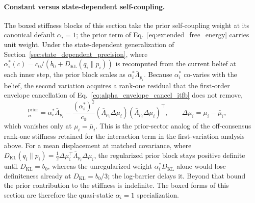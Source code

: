 \paragraph{Constant versus state-dependent self-coupling.} The boxed stiffness blocks of this section take the prior self-coupling weight at its canonical default $\alpha_i = 1$; the prior term of Eq.~\eqref{eq:extended_free_energy} carries unit weight. Under the state-dependent generalization of Section~\ref{sec:state_dependent_precision}, where $\alpha_i^*(c) = c_0/(b_0 + D_{\mathrm{KL}}(q_i \| p_i))$ is recomputed from the current belief at each inner step, the prior block scales as $\alpha_i^* \bar{\Lambda}_{p_i}$. Because $\alpha_i^*$ co-varies with the belief, the second variation acquires a rank-one residual that the first-order envelope cancellation of Eq.~\eqref{eq:alpha_envelope_cancel_itfb} does not remove,
\begin{equation}
[M_{\mu\mu}]_{ii}^{\text{prior}} = \alpha_i^* \bar{\Lambda}_{p_i} - \frac{(\alpha_i^*)^2}{c_0}\left(\bar{\Lambda}_{p_i}\Delta\mu_i\right)\left(\bar{\Lambda}_{p_i}\Delta\mu_i\right)^\top, \qquad \Delta\mu_i = \mu_i - \bar{\mu}_i,
\end{equation}
which vanishes only at $\mu_i = \bar{\mu}_i$. This is the prior-sector analog of the off-consensus rank-one stiffness retained for the interaction term in the first-variation analysis above. For a mean displacement at matched covariance, where $D_{\mathrm{KL}}(q_i \| p_i) = \tfrac{1}{2}\Delta\mu_i^\top \bar{\Lambda}_{p_i}\Delta\mu_i$, the regularized prior block stays positive definite until $D_{\mathrm{KL}} = b_0$, whereas the unregularized weight $\alpha_i^* D_{\mathrm{KL}}$ alone would lose definiteness already at $D_{\mathrm{KL}} = b_0/3$; the log-barrier delays it. Beyond that bound the prior contribution to the stiffness is indefinite. The boxed forms of this section are therefore the quasi-static $\alpha_i = 1$ specialization.


